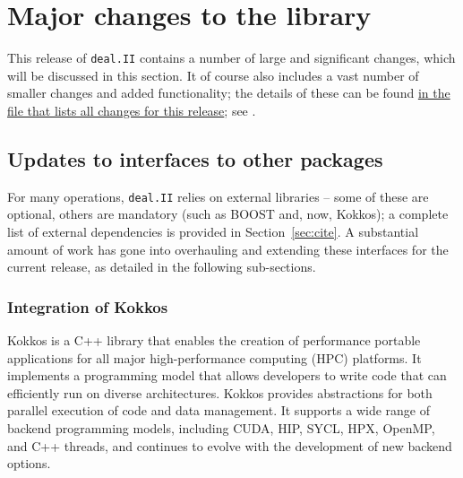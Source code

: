 \documentclass{ansarticle-preprint}
\newcommand{\specialword}[1]{\texttt{#1}}
\newcommand{\dealii}{{\specialword{deal.II}}\xspace}
\begin{document}
\section{Major changes to the library}
\label{sec:major}

This release of \dealii contains a number of large and significant changes,
which will be discussed in this section.
It of course also includes a
vast number of smaller changes and added functionality; the details of these
can be found
\href{https://dealii.org/developer/doxygen/deal.II/changes_between_9_4_2_and_9_5_0.html}
{in the file that lists all changes for this release}; see \cite{changes95}.


\subsection{Updates to interfaces to other packages}\label{sec:external}

For many operations, \dealii{} relies on external libraries -- some of
these are optional, others are mandatory (such as BOOST and, now,
Kokkos); a complete list of external dependencies is provided in
Section~\ref{sec:cite}. A substantial amount of work has gone into
overhauling and extending these interfaces for the current release, as
detailed in the following sub-sections.


\subsubsection{Integration of Kokkos}\label{sec:kokkos}

Kokkos \cite{trott2022} is a C++ library that enables the creation of
performance portable applications for all major high-performance computing (HPC)
platforms. It implements a programming model that allows developers to write
code that can efficiently run on diverse architectures. Kokkos provides
abstractions for both parallel execution of code and data management. It
supports a wide range of backend programming models, including CUDA, HIP, SYCL,
HPX, OpenMP, and C++ threads, and continues to evolve with the development of
new backend options.
\end{document}
